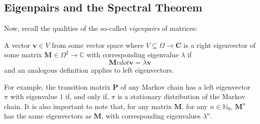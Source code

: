 	\subsection{Eigenpairs and the Spectral Theorem}

	Now, recall the qualities of the so-called \emph{eigenpairs} of matrices: 
	\begin{definition}
		A vector $\mathbf{v} \in V$ from some vector space where $V\subseteq \Omega 
		\rightarrow \mathbf{C}$ is a right eigenvector of some matrix $\mathbf{M} \in 
		\Omega^2 \rightarrow \mathbb{C}$ with corresponding eigenvalue $\lambda$ if 
		$$
			\mathbf{M}cdot\mathbf{v} = \lambda \mathbf{v}
		$$
		and an analogous definition applies to left eigenvectors.
	\end{definition}
	For example, the transition matrix $\mathbf{P}$ of any Markov chain has a left eigenvector 
	$\pi$ with eigenvalue $1$ if, and only if, $\pi$ is a stationary distribution of the Markov 
	chain. It is also important to note that, for any matrix $\mathbf{M}$, for any $n\in
	\mathbb{N}_0$, $\mathbf{M}^n$ has the same eigenvectors as $\mathbf{M}$, with corresponding 
	eigenvalues $\lambda^n$.

